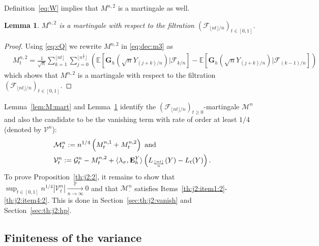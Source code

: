 \documentclass[12pt]{article}
\numberwithin{equation}{section}
\newtheorem{lemma}{Lemma}
\theoremstyle{definition}
\theoremstyle{remark}
\newcommand{\convp}[1][]{\xrightarrow[#1]{\PP}}
\newcommand{\PP}{\mathbb{P}}
\newcommand{\EE}{\mathbb{E}}
\newcommand{\cF}{\mathcal{F}}
\newcommand{\cG}{\mathcal{G}}
\newcommand{\bfH}[1]{\mathbf{E}^Y_{#1}}
\newcommand{\bfG}[1]{\mathbf{G}_{#1}}
\begin{document}
Definition~\eqref{eq:W} implies that $M^{n,2}$ is a martingale as well.
%
%
%
\begin{lemma}  \label{lem:M:mart:2}
	$M^{n,2}$ is a martingale with respect to the filtration $(\cF_{\lfloor n t \rfloor/n})_{t\in [0,1]}$. 
\end{lemma}

\begin{proof}
Using \eqref{eq:cQ} we rewrite $M^{n,2}$ in \eqref{eq:dec:m3} as
\begin{equation} \label{eq:W}
\begin{split}
& M^{n,2}_t  
	= \frac{1}{\sqrt{n}} \sum_{k=1}^{\lfloor n t \rfloor} \sum_{j=0}^{\lfloor n^\frac14\rfloor} \left(\EE\!\left[ \bfG{h}(\sqrt{n} Y_{(j+k)/n})| \cF_{k/n}\right]- \EE\!\left[ \bfG{h}(\sqrt{n} Y_{(j+k)/n})| \cF_{(k-1)/n}\right]\right)
\end{split}
\end{equation}
which shows that $M^{n,2}$ is a martingale with respect to the filtration $(\cF_{\lfloor n t \rfloor/n})_{t\in [0,1]}$.
\end{proof}


Lemma~\ref{lem:M:mart} and Lemma~\ref{lem:M:mart:2} identify the $(\cF_{\lfloor n t \rfloor/n})_{t\geq 0}$-martingale $\mathcal{M}^n$ 
and also the candidate to be the vanishing term with rate of order at least $1/4$ (denoted by $\mathcal{V}^n$):
\begin{equation} \label{eq:mv}
	\begin{split}
	&\mathcal{M}^n_t  := n^{1/4} \left( M^{n,1}_t + M^{n,2}_t \right) 
	\ \text{and\/}  \
	\\
	&
	\mathcal{V}^n_t  := \cG^n_t - M^{n,2}_t + \langle \lambda_\sigma , \bfH h \rangle \left(  L_{\frac{\lfloor n t \rfloor}n}(Y) - L_t(Y) \right).
\end{split}
\end{equation}
%
%
%
To prove Proposition~\ref{th:j2:2}, it remains to show that $\sup_{t\in [0,1]} n^{1/4} |\mathcal{V}^n_t| \convp[n\to\infty] 0$ and that $\mathcal{M}^n_\cdot$ satisfies Items~\ref{th:j2:item1:2}-\ref{th:j2:item4:2}. %
This is done in Section~\ref{sec:th:j2:vanish} and Section~\ref{sec:th:j2:hp}.
%
%
%


\subsection{Finiteness of the variance} \label{sec:finite:K}
\end{document}
